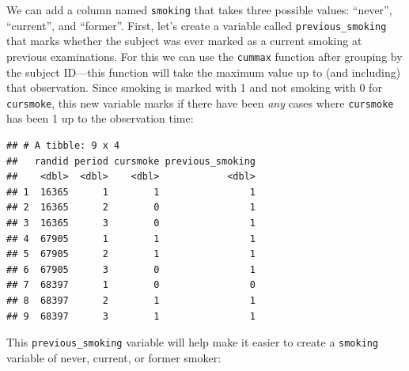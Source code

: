 \documentclass[
]{book}
\newenvironment{Shaded}{\begin{snugshade}}{\end{snugshade}}
\newcommand{\CommentTok}[1]{\textcolor[rgb]{0.56,0.35,0.01}{\textit{#1}}}
\newcommand{\DataTypeTok}[1]{\textcolor[rgb]{0.13,0.29,0.53}{#1}}
\newcommand{\DecValTok}[1]{\textcolor[rgb]{0.00,0.00,0.81}{#1}}
\newcommand{\KeywordTok}[1]{\textcolor[rgb]{0.13,0.29,0.53}{\textbf{#1}}}
\newcommand{\NormalTok}[1]{#1}
\newcommand{\OperatorTok}[1]{\textcolor[rgb]{0.81,0.36,0.00}{\textbf{#1}}}
\newcommand{\StringTok}[1]{\textcolor[rgb]{0.31,0.60,0.02}{#1}}
\begin{document}
We can add a column named \texttt{smoking} that takes three possible values: ``never'', ``current'', and ``former''. First, let's create a variable called \texttt{previous\_smoking} that marks whether the subject was ever marked as a current smoking at previous examinations. For this we can use the \texttt{cummax} function after grouping by the subject ID---this function will take the maximum value up to (and including) that observation. Since smoking is marked with 1 and not smoking with 0 for \texttt{cursmoke}, this new variable marks if there have been \emph{any} cases where \texttt{cursmoke} has been 1 up to the observation time:

\begin{Shaded}
\end{Shaded}

\begin{verbatim}
## # A tibble: 9 x 4
##   randid period cursmoke previous_smoking
##    <dbl>  <dbl>    <dbl>            <dbl>
## 1  16365      1        1                1
## 2  16365      2        0                1
## 3  16365      3        0                1
## 4  67905      1        1                1
## 5  67905      2        1                1
## 6  67905      3        0                1
## 7  68397      1        0                0
## 8  68397      2        1                1
## 9  68397      3        1                1
\end{verbatim}

This \texttt{previous\_smoking} variable will help make it easier to create a \texttt{smoking} variable of never, current, or former smoker:
\end{document}
